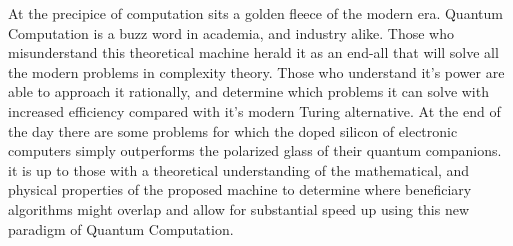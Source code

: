 At the precipice of computation sits a golden fleece of the modern era. Quantum Computation is a buzz word in academia, and industry alike. Those who misunderstand this theoretical machine 
herald it as an end-all that will solve all the modern problems in complexity theory. Those who understand it's power are able to approach it rationally, and determine which problems it 
can solve with increased efficiency compared with it's modern Turing alternative. At the end of the day there are some problems for which the doped silicon of electronic computers simply outperforms the polarized glass of their quantum companions. it is up to those with a theoretical understanding of the mathematical, and physical properties of the proposed machine to determine where beneficiary algorithms might overlap and allow for substantial speed up using this new paradigm of Quantum Computation.